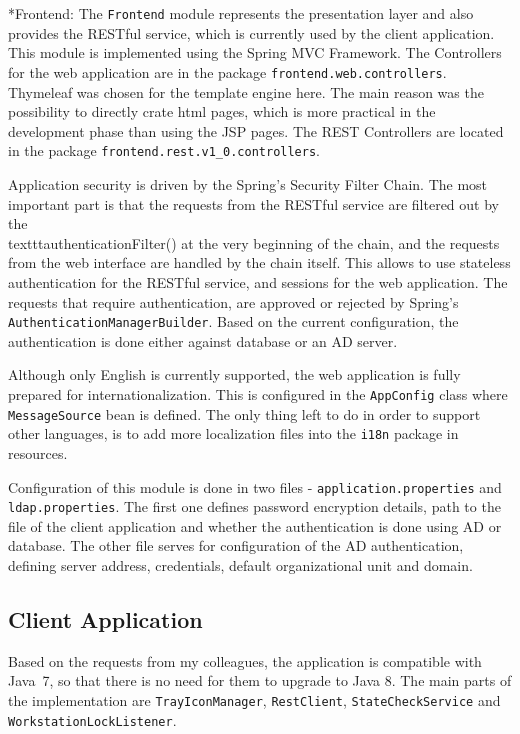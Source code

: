 \documentclass[11pt,singleside]{myfithesis2}
\makeatletter
\renewcommand\paragraph{
   \vspace{-10pt}
   \@startsection{paragraph}{4}{0mm}
      {\baselineskip}
      {- 5pt}
      {\normalfont\normalsize\bfseries}
}
\makeatother
\begin{document}
\paragraph*{Frontend: } The \texttt{Frontend} module represents the presentation layer and also provides the RESTful service, which is currently used by the client application. This module is implemented using the Spring MVC Framework. The Controllers for the web application are in the package \texttt{frontend.web.controllers}. Thymeleaf was chosen for the template engine here. The main reason was the possibility to directly crate html pages, which is more practical in the development phase than using the JSP pages. The REST Controllers are located in the package \texttt{frontend.rest.v1\_0.controllers}. 

Application security is driven by the Spring's Security Filter Chain. The most important part is that the requests from the RESTful service are filtered out by the \\texttt{authenticationFilter()} at the very beginning of the chain, and the requests from the web interface are handled by the chain itself. This allows to use stateless authentication for the RESTful service, and sessions for the web application. The requests that require authentication, are approved or rejected by Spring's \texttt{AuthenticationManagerBuilder}. Based on the current configuration, the authentication is done either against database or an AD server.

Although only English is currently supported, the web application is fully prepared for internationalization. This is configured in the \texttt{AppConfig} class where \texttt{MessageSource} bean is defined. The only thing left to do in order to support other languages, is to add more localization files into the \texttt{i18n} package in resources.

Configuration of this module is done in two files - \texttt{application.properties} and \texttt{ldap.properties}. The first one defines password encryption details, path to the file of the client application and whether the authentication is done using AD or database. The other file serves for configuration of the AD authentication, defining server address, credentials, default organizational unit and domain.

		\subsection{Client Application}
\begin{sloppypar}
Based on the requests from my colleagues, the application is compatible with Java~7, so that there is no need for them to upgrade to Java 8. The main parts of the implementation are \texttt{TrayIconManager}, \texttt{RestClient}, \texttt{StateCheckService} and \texttt{WorkstationLockListener}.
\end{sloppypar}
\end{document}
